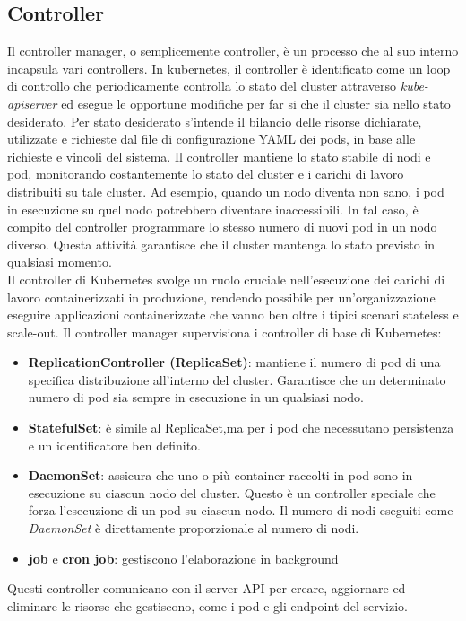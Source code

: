 \documentclass[12pt, a4paper]{report}
\begin{document}
\subsection{Controller}
 Il controller manager, o semplicemente controller, è un processo che al suo interno incapsula vari controllers. In kubernetes, il controller è identificato come un loop di controllo che periodicamente controlla lo stato del cluster attraverso \textit{kube-apiserver} ed esegue le opportune modifiche per far si che il cluster sia nello stato desiderato. Per stato desiderato s'intende il bilancio delle risorse dichiarate, utilizzate e richieste dal file di configurazione YAML dei pods, in base alle richieste e vincoli del sistema. Il controller mantiene lo stato stabile di nodi e pod, monitorando costantemente lo stato del cluster e i carichi di lavoro distribuiti su tale cluster. Ad esempio, quando un nodo diventa non sano, i pod in esecuzione su quel nodo potrebbero diventare inaccessibili. In tal caso, è compito del controller programmare lo stesso numero di nuovi pod in un nodo diverso. Questa attività garantisce che il cluster mantenga lo stato previsto in qualsiasi momento. \\
 Il controller di Kubernetes svolge un ruolo cruciale nell'esecuzione dei carichi di lavoro containerizzati in produzione, rendendo possibile per un'organizzazione eseguire applicazioni containerizzate che vanno ben oltre i tipici scenari stateless e scale-out. Il controller manager supervisiona i controller di base di Kubernetes:
 \begin{itemize}
   \item \textbf{ReplicationController (ReplicaSet)}: mantiene il numero di pod di una specifica distribuzione all'interno del cluster. Garantisce che un determinato numero di pod sia sempre in esecuzione in un qualsiasi nodo.
   \item \textbf{StatefulSet}: è simile al ReplicaSet,ma per i pod che necessutano persistenza e un identificatore ben definito.
   \item \textbf{DaemonSet}: assicura che uno o più container raccolti in pod sono in esecuzione su ciascun nodo del cluster. Questo è un controller speciale che forza l'esecuzione di un pod su ciascun nodo. Il numero di nodi eseguiti come \textit{DaemonSet} è direttamente proporzionale al numero di nodi.
   \item \textbf{job} e \textbf{cron job}: gestiscono l'elaborazione in background
 \end{itemize}
Questi controller comunicano con il server API per creare, aggiornare ed eliminare le risorse che gestiscono, come i pod e gli endpoint del servizio.\\
\end{document}
